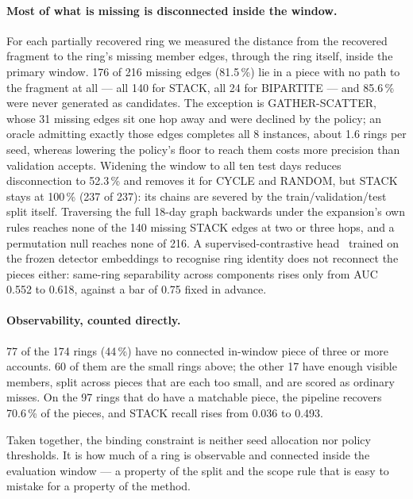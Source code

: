 \paragraph{Most of what is missing is disconnected inside the window.}
For each partially recovered ring we measured the distance from the recovered fragment to the
ring's missing member edges, through the ring itself, inside the primary window. 176 of 216
missing edges (81.5\,\%) lie in a piece with no path to the fragment at all --- all 140 for
STACK, all 24 for BIPARTITE --- and 85.6\,\% were never generated as candidates. The exception
is GATHER-SCATTER, whose 31 missing edges sit one hop away and were declined by the policy; an
oracle admitting exactly those edges completes all 8 instances, about 1.6 rings per seed,
whereas lowering the policy's floor to reach them costs more precision than validation
accepts.
Widening the window to all ten test days reduces disconnection to 52.3\,\% and removes it for
CYCLE and RANDOM, but STACK stays at 100\,\% (237 of 237): its chains are severed by the
train/validation/test split itself. Traversing the full 18-day graph backwards under the
expansion's own rules reaches none of the 140 missing STACK edges at two or three hops, and a
permutation null reaches none of 216.
A supervised-contrastive head~\citep{khosla2020} trained on the frozen detector embeddings to
recognise ring identity does not reconnect the pieces either: same-ring separability across
components rises only from AUC 0.552 to 0.618, against a bar of 0.75 fixed in advance.

\paragraph{Observability, counted directly.}
77 of the 174 rings (44\,\%) have no connected in-window piece of three or more accounts. 60
of them are the small rings above; the other 17 have enough visible members, split across
pieces that are each too small, and are scored as ordinary misses. On the 97 rings that do
have a matchable piece, the pipeline recovers 70.6\,\% of the pieces, and STACK recall rises
from 0.036 to 0.493.

Taken together, the binding constraint is neither seed allocation nor policy thresholds. It is
how much of a ring is observable and connected inside the evaluation window --- a property of
the split and the scope rule that is easy to mistake for a property of the method.


